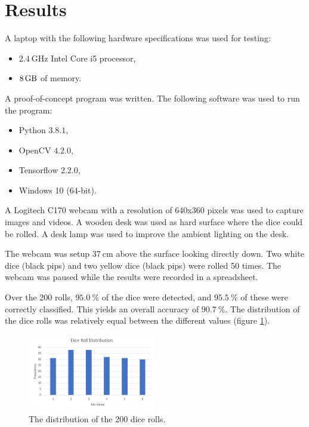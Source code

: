 \documentclass[conference]{IEEEtran}
\begin{document}
\section{Results}

A laptop with the following hardware specifications was used for testing:
\begin{itemize}
	\item $\SI{2.4}{\giga\hertz}$ Intel Core i5 processor,
	\item $\SI{8}{\giga\byte}$ of memory.
\end{itemize}

A proof-of-concept program was written.
The following software was used to run the program:
\begin{itemize}
	\item Python $3.8.1$,
	\item OpenCV $4.2.0$,
	\item Tensorflow $2.2.0$,
	\item Windows 10 (64-bit).
\end{itemize}

A Logitech C170 webcam with a resolution of 640x360 pixels was used to capture images and videos.
A wooden desk was used as hard surface where the dice could be rolled.
A desk lamp was used to improve the ambient lighting on the desk. 

The webcam was setup $\SI{37}{\centi\metre}$ above the surface looking directly down. 
Two white dice (black pips) and two yellow dice (black pips) were rolled 50 times.
The webcam was paused while the results were recorded in a spreadsheet.

Over the 200 rolls, $\SI{95.0}{\percent}$ of the dice were detected, and $\SI{95.5}{\percent}$ of these were correctly classified.
This yields an overall accuracy of $\SI{90.7}{\percent}$.
The distribution of the dice rolls was relatively equal between the different values (figure \ref{fig:results}).
\begin{figure}
	\centering
	\includegraphics[width=0.5\textwidth]{results}
	\caption{The distribution of the 200 dice rolls.}
	\label{fig:results}
\end{figure}
\end{document}
